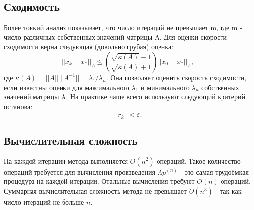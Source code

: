 \subsection*{Сходимость} 
Более тонкий анализ показывает, что число итераций не превышает m, где m - число различных собственных значений матрицы A. Для оценки скорости сходимости верна следующая (довольно грубая) оценка:
 $$|| x_k - x_* ||_A \leq  ( \frac{ \sqrt  {\kappa(A) } - 1}{ \sqrt { \kappa(A) } + 1} ) || x_0 - x_* ||_A,$$ где
 $\kappa(A) = || A || \: || A^{-1} || = \lambda_1 / \lambda_n .$ Она позволяет оценить скорость сходимости, если известны оценки для максимального $\lambda_1$ и минимального $\lambda_n$ собственных значений матрицы A. На практике чаще всего используют следующий критерий останова: $$|| r_k || < \varepsilon. $$
\subsection*{Вычислительная сложность}
На каждой итерации метода выполняется $O(n^2)$ операций. Такое количество операций требуется для вычисления произведения $Ap^{(n)}$ - это самая трудоёмкая процедура на каждой итерации. Отальные вычисления требуют $O(n)$ операций. Суммарная вычислительная сложность метода не превышает $O(n^3)$ - так как число итераций не больше $n$.

\pagebreak
